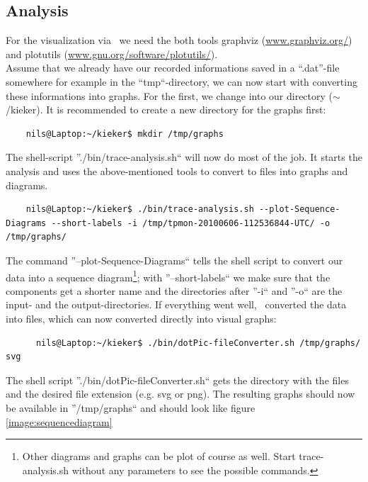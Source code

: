 \documentclass[a4paper, oneside, 11pt]{scrartcl}
\begin{document}
    \subsection{Analysis}
      For the visualization via \Kieker\ we need the both tools graphviz (\url{www.graphviz.org/}) and plotutils (\url{www.gnu.org/software/plotutils/}).\\
      Assume that we already have our recorded informations saved in a ``.dat''-file somewhere for example in the ``tmp``-directory, we can now start with converting these informations into graphs. For the first, we change into our \Kieker\-directory ($\sim$/kieker). It is recommended to create a new directory for the graphs first:
      \begin{lstlisting}
	nils@Laptop:~/kieker$ mkdir /tmp/graphs
      \end{lstlisting}
      The shell-script ''./bin/trace-analysis.sh`` will now do most of the job. It starts the analysis and uses the above-mentioned tools to convert to files into graphs and diagrams.
      \begin{lstlisting}
	nils@Laptop:~/kieker$ ./bin/trace-analysis.sh --plot-Sequence-Diagrams --short-labels -i /tmp/tpmon-20100606-112536844-UTC/ -o /tmp/graphs/
      \end{lstlisting}
	The command ''--plot-Sequence-Diagrams`` tells the shell script to convert our data into a sequence diagram\footnote{Other diagrams and graphs can be plot of course as well. Start trace-analysis.sh without any parameters to see the possible commands.}; with ''--short-labels`` we make sure that the components get a shorter name and the directories after ''-i`` and ''-o`` are the input- and the output-directories. If everything went well, \Kieker\ converted the data into files, which can now converted directly into visual graphs:
	\begin{lstlisting}
	  nils@Laptop:~/kieker$ ./bin/dotPic-fileConverter.sh /tmp/graphs/ svg
	\end{lstlisting}
	The shell script ''./bin/dotPic-fileConverter.sh`` gets the directory with the files and the desired file extension (e.g. svg or png). The resulting graphs should now be available in ''/tmp/graphs`` and should look like figure \ref{image:sequencediagram}
\end{document}
